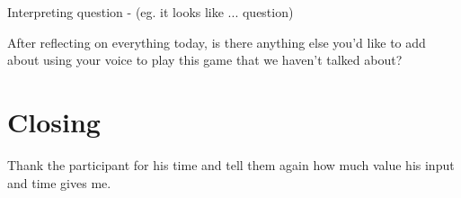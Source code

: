 \begin{QandA}
   \item Interpreting question - (eg. it looks like ... question) 
         \begin{answered}
         
         \end{answered}

   \item After reflecting on everything today, is there anything else you’d 
like to add about using your voice to play this game that we haven't talked about?

         \begin{answered}
         
         \end{answered}
\end{QandA}

\section{Closing}
Thank the participant for his time and tell them again how much value his input and time gives me.






